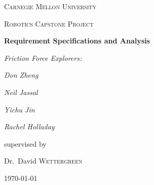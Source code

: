 \documentclass{spec}
\theoremstyle{definition}
\begin{document}
\begin{titlepage}
	\centering
	{\scshape\LARGE Carnegie Mellon University \par}
	\vspace{1cm}
	{\scshape\Large Robotics Capstone Project\par}
	\vspace{1.5cm}
	{\huge\bfseries Requirement Specifications and Analysis\par}
	\vspace{2cm}
	{\Large\itshape Friction Force Explorers:\par}
	\vspace{1cm}
	{\Large\itshape Don Zheng\par}
	{\Large\itshape Neil Jassal\par}
	{\Large\itshape Yichu Jin\par}
	{\Large\itshape Rachel Holladay\par}
	\vfill
	supervised by\par
	Dr.~David \textsc{Wettergreen}

	\vfill

	{\large \today\par}
\end{titlepage}

\tableofcontents
\listoffigures
\clearpage








\pagebreak
\listofchanges
\pagebreak

{\footnotesize

}
\end{document}
